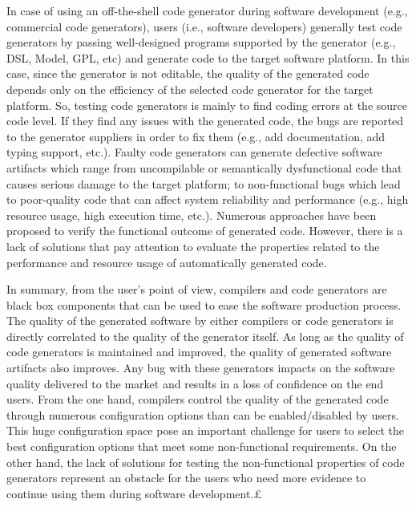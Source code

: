 In case of using an off-the-shell code generator during software development (e.g., commercial code generators), 
users (i.e., software developers) generally test code generators by passing well-designed programs supported by the generator (e.g., DSL, Model, GPL, etc) and generate code to the target software platform. 
In this case, since the generator is not editable, the quality of the generated code depends only on the efficiency of the selected code generator for the target platform. So, testing code generators is mainly to find coding errors at the source code level. If they find any issues with the generated code, the bugs are reported to the generator suppliers in order to fix them (e.g., add documentation, add typing support, etc.).
Faulty code generators can generate defective software artifacts which range from uncompilable or semantically dysfunctional code that causes serious damage to the target platform; to non-functional bugs which lead to poor-quality code that can affect system reliability and performance (e.g., high resource usage, high execution time, etc.).
Numerous approaches have been proposed\cite{stuermer2007systematic,yang2011finding} to verify the functional outcome of generated code. However, there is a lack of solutions that pay attention to evaluate the properties related to the performance and resource usage of automatically generated code.


In summary, from the user's point of view, compilers and code generators are black box components that can be used to ease the software production process. The quality of the generated software by either compilers or code generators is directly correlated to the quality of the generator itself. As long as the quality of code generators is maintained and improved, the quality of generated software artifacts also improves. Any bug with these generators impacts on the software quality delivered to the market and results in a loss of confidence on the end users.
From the one hand, compilers control the quality of the generated code through numerous configuration options than can be enabled/disabled by users. This huge configuration space pose an important challenge for users to select the best configuration options that meet some non-functional requirements.
On the other hand, the lack of solutions for testing the non-functional properties of code generators represent an obstacle for the users who need more evidence to continue using them during software development.£



